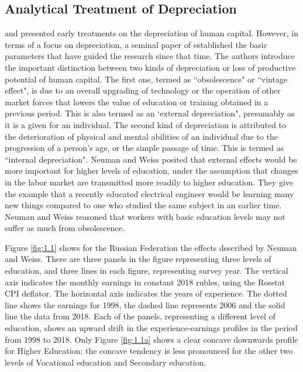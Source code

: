 \documentclass[alpha-refs]{wiley-article-02b}
\begin{document}
\subsection{Analytical Treatment of Depreciation} 

\citet{Rosen_1976}  and \citet{Mincer_1982} presented early treatments on the depreciation of human capital. However, in terms of a focus on depreciation, a seminal paper of \citet{Neuman_1995} established the basic parameters that have guided the research since that time. The authors introduce the important distinction between two kinds of depreciation or loss of productive potential of human capital. The first one, termed as ``obsolescence" or ``vintage effect", is due to an overall upgrading of technology or the operation of other market forces that lowers the value of education or training obtained in a previous period. This is also termed as an `external depreciation", presumably as it is a given for an individual. The second kind of depreciation is attributed to the deterioration of physical and mental abilities of an individual due to the progression of a person's age, or the simple passage of time. This is termed as ``internal depreciation". Neuman and Weiss posited that external effects would be more important for higher levels of education, under the assumption that changes in the labor market are transmitted more readily to higher education. They give the example that a recently educated electrical engineer would be learning many new things compared to one who studied the same subject in an earlier time. Neuman and Weiss reasoned that workers with basic education levels may not suffer as much from obsolescence. 

Figure \ref{fig:1.1} shows for the Russian Federation the effects described 
by Neuman and Weiss. There are three panels in the figure representing 
three levels of education, and three lines in each figure, representing 
survey year. The vertical axis indicates the monthly earnings in constant 
2018 rubles, using the Rosstat CPI deflator. The horizontal axis indicates 
the years of experience. The dotted line shows the earnings for 1998, the 
dashed line represents 2006 and the solid line the data from 2018. Each of 
the panels, representing a different level of education, shows an upward 
drift in the experience-earnings profiles in the period from 1998 to 2018. 
Only Figure \ref{fig:1.1a} shows a clear concave downwards profile for 
Higher Education; the concave tendency is less pronounced for the other two 
levels of Vocational education and Secondary education.
	
\end{document}
